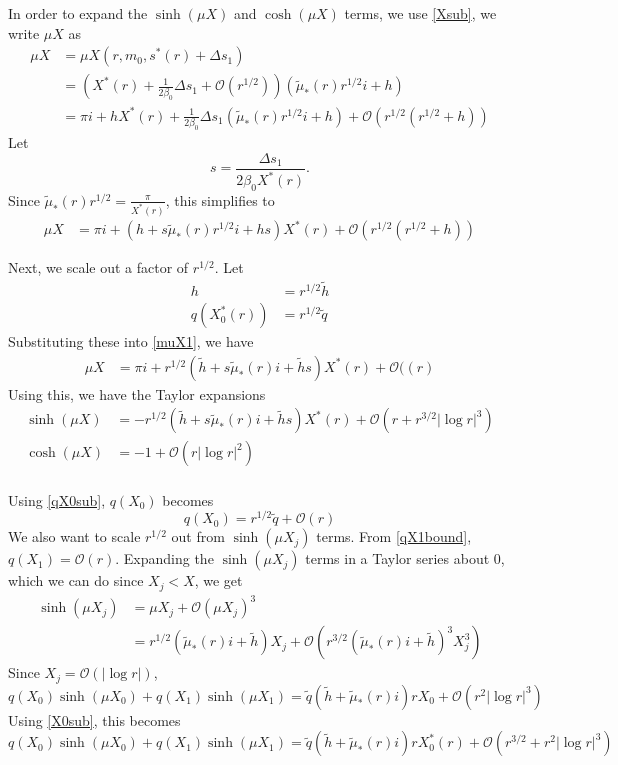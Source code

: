 \documentclass[thesis.tex]{subfiles}
\begin{document}
In order to expand the $\sinh(\mu X)$ and $\cosh(\mu X)$ terms, we use \cref{Xsub}, we write $\mu X$ as 
\begin{align*}
\mu X &= \mu X(r, m_0, s^*(r) + \Delta s_1) \\
&= \left( X^*(r) + \frac{1}{2 \beta_0} \Delta s_1 + \mathcal{O}(r^{1/2}) \right)\left( \tilde{\mu}_*(r) r^{1/2} i + h\right) \\
&= \pi i + h X^*(r) + \frac{1}{2 \beta_0} \Delta s_1 \left( \tilde{\mu}_*(r) r^{1/2} i + h\right) + \mathcal{O}\left( r^{1/2}(r^{1/2} + h) \right)
\end{align*}
Let 
\[
s = \frac{\Delta s_1}{2 \beta_0 X^*(r)}.
\]
Since $\tilde{\mu}_*(r) r^{1/2} = \frac{\pi}{X^*(r)}$, this simplifies to 
\begin{align}\label{muX1}
\mu X &= \pi i + \left( h + s \tilde{\mu}_*(r) r^{1/2} i + h s \right)X^*(r) + \mathcal{O}\left( r^{1/2}(r^{1/2} + h) \right)
\end{align}

Next, we scale out a factor of $r^{1/2}$. Let
\begin{align*}
h &= r^{1/2} \tilde{h} \\
q(X_0^*(r)) &= r^{1/2} \tilde{q}
\end{align*}
Substituting these into \cref{muX1}, we have
\begin{align}\label{muX2}
\mu X &= \pi i + r^{1/2} \left( \tilde{h} + s \tilde{\mu}_*(r)i + \tilde{h} s \right)X^*(r) + \mathcal{O}(\left( r \right)
\end{align}
Using this, we have the Taylor expansions
\begin{align*}
\sinh(\mu X) &= -r^{1/2} \left( \tilde{h} + s \tilde{\mu}_*(r) i + \tilde{h} s \right)X^*(r) + \mathcal{O}\left( r + r^{3/2}|\log r|^3 \right) \\
\cosh(\mu X) &= -1 + \mathcal{O}\left( r |\log r|^2 \right) \\
\end{align*}

Using \cref{qX0sub}, $q(X_0)$ becomes
\[
q(X_0) = r^{1/2}\tilde{q} + \mathcal{O}(r)
\]
We also want to scale $r^{1/2}$ out from $\sinh(\mu X_j)$ terms. From \cref{qX1bound}, $q(X_1) = \mathcal{O}(r)$. Expanding the $\sinh(\mu X_j)$ terms in a Taylor series about 0, which we can do since $X_j < X$, we get
\begin{align*}
\sinh(\mu X_j) &= \mu X_j + \mathcal{O}(\mu X_j)^3 \\
&= r^{1/2}(\tilde{\mu}_*(r)i + \tilde{h})X_j + \mathcal{O}(r^{3/2} (\tilde{\mu}_*(r)i + \tilde{h})^3 X_j^3)
\end{align*}
Since $X_j = \mathcal{O}(|\log r|)$,
\[
q(X_0) \sinh(\mu X_0) + q(X_1) \sinh(\mu X_1)
= \tilde{q}(\tilde{h} + \tilde{\mu}_*(r)i )r X_0 + \mathcal{O}(r^2 |\log r|^3)
\]
Using \cref{X0sub}, this becomes
\[
q(X_0) \sinh(\mu X_0) + q(X_1) \sinh(\mu X_1)
= \tilde{q}(\tilde{h} + \tilde{\mu}_*(r)i )r X_0^*(r) + \mathcal{O}(r^{3/2} + r^2 |\log r|^3)
\]
\end{document}
